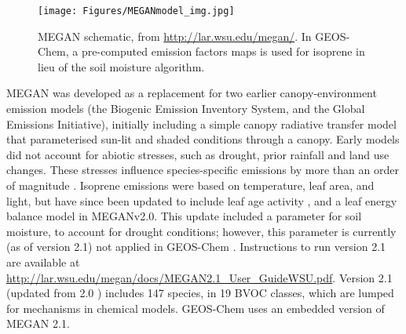     \begin{figure}
      \texttt{[image: Figures/MEGANmodel\_img.jpg]}
      \caption{%
        MEGAN schematic, from \url{http://lar.wsu.edu/megan/}.
        In GEOS-Chem, a pre-computed emission factors maps is used for isoprene in lieu of the soil moisture algorithm.
      }
      \label{Model:GC:Isop:MEGAN:fig_megan_schematic}
    \end{figure}
    
    MEGAN was developed as a replacement for two earlier canopy-environment emission models (the Biogenic Emission Inventory System, and the Global Emissions Initiative), initially including a simple canopy radiative transfer model that parameterised sun-lit and shaded conditions through a canopy.
    Early models did not account for abiotic stresses, such as drought, prior rainfall and land use changes. 
    These stresses influence species-specific emissions by more than an order of magnitude \parencite{Niinemets1999}.
    Isoprene emissions were based on temperature, leaf area, and light, but have since been updated to include leaf age activity \parencite{Guenther2000}, and a leaf energy balance model \parencite{Guenther2006} in MEGANv2.0.
    This update included a parameter for soil moisture, to account for drought conditions; however, this parameter is currently (as of version 2.1) not applied in GEOS-Chem \parencite{Sindelarova2014}.
    Instructions to run version 2.1 are available at \url{http://lar.wsu.edu/megan/docs/MEGAN2.1_User_GuideWSU.pdf}.
    Version 2.1 (updated from 2.0 \parencite{Guenther2006}) includes 147 species, in 19 BVOC classes, which are lumped for mechanisms in chemical models.
    GEOS-Chem uses an embedded version of MEGAN 2.1.
    
